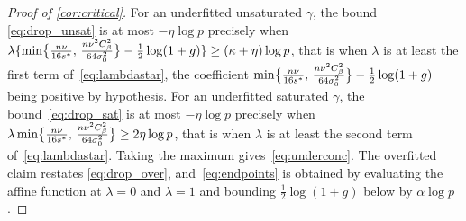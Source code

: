\begin{proof}[Proof of \cref{cor:critical}]
    For an underfitted unsaturated $\gamma$, the bound
    \eqref{eq:drop_unsat} is at most $-\eta\log p$ precisely when
    $\lambda\{\min\bigl\{\tfrac{n\nu}{16s^{\ast}},\, \tfrac{n\nu^{2}C_\beta^{2}}{64\sigma_0^{2}}\bigr\}-\tfrac12\log(1+g)\}\geq(\kappa+\eta)\log p$,
    that is when $\lambda$ is at least the first term
    of~\eqref{eq:lambdastar}, the coefficient
    $\min\bigl\{\tfrac{n\nu}{16s^{\ast}},\, \tfrac{n\nu^{2}C_\beta^{2}}{64\sigma_0^{2}}\bigr\}-\tfrac12\log(1+g)$ being positive by hypothesis. For an
    underfitted saturated $\gamma$, the bound~\eqref{eq:drop_sat} is
    at most $-\eta\log p$ precisely when
    $\lambda\min\bigl\{\tfrac{n\nu}{16s^{\ast}},\, \tfrac{n\nu^{2}C_\beta^{2}}{64\sigma_0^{2}}\bigr\}\geq2\eta\log p$, that is when $\lambda$ is at
    least the second term of~\eqref{eq:lambdastar}. Taking the maximum
    gives~\eqref{eq:underconc}. The overfitted claim restates
    \eqref{eq:drop_over}, and~\eqref{eq:endpoints} is
    obtained by evaluating the affine function at $\lambda=0$ and
    $\lambda=1$ and bounding $\tfrac12\log(1+g)$ below by
    $\alpha\log p$.
\end{proof}

